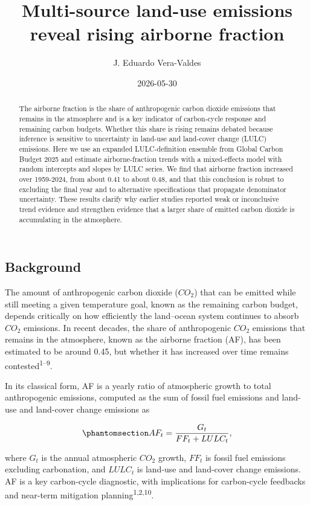 \documentclass[
  12pt,
  letterpaper,
  DIV=11,
  numbers=noendperiod]{scrartcl}
\title{Multi-source land-use emissions reveal rising airborne fraction}
\author{J. Eduardo Vera-Valdes}
\date{2026-05-30}
\begin{document}
\maketitle
\begin{abstract}
The airborne fraction is the share of anthropogenic carbon dioxide
emissions that remains in the atmosphere and is a key indicator of
carbon-cycle response and remaining carbon budgets. Whether this share
is rising remains debated because inference is sensitive to uncertainty
in land-use and land-cover change (LULC) emissions. Here we use an
expanded LULC-definition ensemble from Global Carbon Budget 2025 and
estimate airborne-fraction trends with a mixed-effects model with random
intercepts and slopes by LULC series. We find that airborne fraction
increased over 1959-2024, from about 0.41 to about 0.48, and that this
conclusion is robust to excluding the final year and to alternative
specifications that propagate denominator uncertainty. These results
clarify why earlier studies reported weak or inconclusive trend evidence
and strengthen evidence that a larger share of emitted carbon dioxide is
accumulating in the atmosphere.
\end{abstract}


\subsection*{Background}\label{background}

The amount of anthropogenic carbon dioxide (\(CO_2\)) that can be
emitted while still meeting a given temperature goal, known as the
remaining carbon budget, depends critically on how efficiently the
land--ocean system continues to absorb \(CO_2\) emissions. In recent
decades, the share of anthropogenic \(CO_2\) emissions that remains in
the atmosphere, known as the airborne fraction (AF), has been estimated
to be around 0.45, but whether it has increased over time remains
contested\textsuperscript{1--9}.

In its classical form, AF is a yearly ratio of atmospheric growth to
total anthropogenic emissions, computed as the sum of fossil fuel
emissions and land-use and land-cover change emissions as

\begin{equation}\protect\phantomsection\label{eq-af-def}{
AF_t = \frac{G_t}{FF_t + LULC_t},
}\end{equation}

where \(G_t\) is the annual atmospheric \(CO_2\) growth, \(FF_t\) is
fossil fuel emissions excluding carbonation, and \(LULC_t\) is land-use
and land-cover change emissions. AF is a key carbon-cycle diagnostic,
with implications for carbon-cycle feedbacks and near-term mitigation
planning\textsuperscript{1,2,10}.
\end{document}
